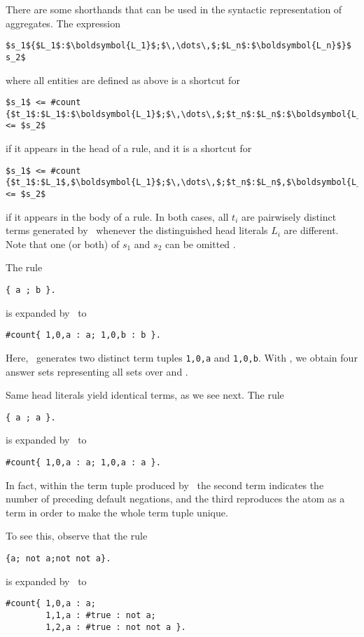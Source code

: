 There are some shorthands that can be used in the syntactic representation of aggregates.
%
The expression
%
\begin{lstlisting}[numbers=none,mathescape]
$s_1${$L_1$:$\boldsymbol{L_1}$;$\,\dots\,$;$L_n$:$\boldsymbol{L_n}$}$ s_2$
\end{lstlisting}
%
where all entities are defined as above 
is a shortcut for
%
\begin{lstlisting}[numbers=none,mathescape]
$s_1$ <= #count {$t_1$:$L_1$:$\boldsymbol{L_1}$;$\,\dots\,$;$t_n$:$L_n$:$\boldsymbol{L_n}$} <= $s_2$
\end{lstlisting}
%
if it appears in the head of a rule, and
it is a shortcut for
%
\begin{lstlisting}[numbers=none,mathescape]
$s_1$ <= #count {$t_1$:$L_1$,$\boldsymbol{L_1}$;$\,\dots\,$;$t_n$:$L_n$,$\boldsymbol{L_n}$} <= $s_2$
\end{lstlisting}
%
if it appears in the body of a rule.
In both cases, all $t_i$ are pairwisely distinct terms generated by \gringo\
whenever the distinguished head literals $L_i$ are different.
%
Note that one (or both) of $s_1$ and $s_2$ can be omitted .

\begin{example}
The rule
\begin{lstlisting}[numbers=none]
{ a ; b }.
\end{lstlisting}
is expanded by \gringo\ to
\begin{lstlisting}[numbers=none]
#count{ 1,0,a : a; 1,0,b : b }.
\end{lstlisting}  
Here, \gringo\ generates two distinct term tuples \lstinline{1,0,a} and \lstinline{1,0,b}.
With \clingo, we obtain four answer sets representing all sets over \code{a} and \code{b}.

Same head literals yield identical terms, as we see next.
The rule
\begin{lstlisting}[numbers=none]
{ a ; a }.
\end{lstlisting}
is expanded by \gringo\ to
\begin{lstlisting}[numbers=none]
#count{ 1,0,a : a; 1,0,a : a }.
\end{lstlisting}  

In fact, within the term tuple produced by \gringo\
the second term indicates the number of preceding default negations,
and the third reproduces the atom as a term in order to make the whole term tuple unique.

To see this, observe that the rule
\begin{lstlisting}[numbers=none]
{a; not a;not not a}.
\end{lstlisting}
is expanded by \gringo\ to
\begin{lstlisting}[numbers=none]
#count{ 1,0,a : a; 
        1,1,a : #true : not a; 
        1,2,a : #true : not not a }.
\end{lstlisting}
\eexample
\end{example}

